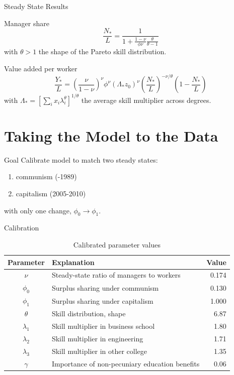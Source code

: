 \documentclass[
  ignorenonframetext,
  aspectratio=1610,
]{beamer}
\providecommand{\tightlist}{%
  \setlength{\itemsep}{0pt}\setlength{\parskip}{0pt}}
\begin{document}
\begin{frame}{Steady State Results}
\protect\hypertarget{steady-state-results}{}
\begin{block}{Manager share}
\protect\hypertarget{manager-share}{}
\[
\frac{N_*}{L} = \frac 1{1+  
\frac {1-\nu}{\phi\nu}
\frac {\theta}{\theta - 1}}
\] with \(\theta>1\) the shape of the Pareto skill distribution.

\pause
\end{block}

\begin{block}{Value added per worker}
\protect\hypertarget{value-added-per-worker}{}
\[
\frac{Y_*}{L} = 
\left(\frac{\nu}{1-\nu} \right)^\nu
\phi^\nu
(\Lambda_* z_0)^\nu
\left(\frac {N_*}{L}
\right)^{-\nu/\theta}
\left(1-\frac {N_*}{L}
\right)
\] with
\(\Lambda_* = \left[\sum_i x_i \lambda_i^\theta \right]^{1/\theta}\) the
average skill multiplier across degrees.
\end{block}
\end{frame}

\section{Taking the Model to the
Data}\label{taking-the-model-to-the-data}

\begin{frame}{Goal}
\protect\hypertarget{goal}{}
Calibrate model to match two steady states:

\begin{enumerate}
\tightlist
\item
  communism (-1989)
\item
  capitalism (2005-2010)
\end{enumerate}

with only one change, \(\phi_0 \to \phi_1\).
\end{frame}

\begin{frame}{Calibration}
\protect\hypertarget{calibration}{}
\begin{table}[ht!]
\centering
\caption{Calibrated parameter values}   
\begin{tabular}{clr}
  \hline
Parameter & Explanation & Value \\
    \hline
$\nu$ & Steady-state ratio of managers to workers & 0.174 \\
$\phi_0$ & Surplus sharing under communism & 0.130 \\
$\phi_1$ & Surplus sharing under capitalism & 1.000 \\
$\theta$ & Skill distribution, shape & 6.87 \\
$\lambda_1$ & Skill multiplier in business school & 1.80 \\
$\lambda_2$ & Skill multiplier in engineering & 1.71 \\
$\lambda_3$ & Skill multiplier in other college & 1.35 \\
$\gamma$ & Importance of non-pecuniary education benefits & 0.06 \\
    \hline
\end{tabular}
\end{table}
\end{frame}
\end{document}
